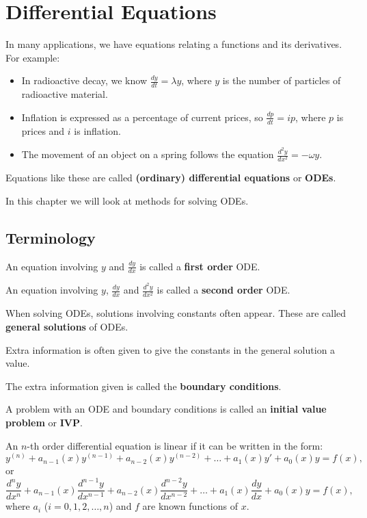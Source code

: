 \chapter{Differential Equations}

In many applications, we have equations relating a functions and its derivatives. For example:

\begin{itemize}
\item[ ] In radioactive decay, we know $\displaystyle \frac{dy}{dt} = \lambda y$, where $y$ is the number of particles of radioactive material.
\item[ ] Inflation is expressed as a percentage of current prices, so $\displaystyle \frac{dp}{dt} = i p$, where $p$ is prices and $i$ is inflation.
\item[ ] The movement of an object on a spring follows the equation $\displaystyle \frac{d^2 y}{dx^2} = -\omega y$.
\end{itemize}

Equations like these are called \textbf{(ordinary) differential equations} or \textbf{ODEs}.

In this chapter we will look at methods for solving ODEs.

\section{Terminology}
\begin{definition}
An equation involving $y$ and $\displaystyle\frac{dy}{dx}$ is called a \textbf{first order} ODE.

An equation involving $y$, $\displaystyle\frac{dy}{dx}$ and $\displaystyle\frac{d^2y}{dx^2}$ is called a \textbf{second order} ODE.

When solving ODEs, solutions involving constants often appear. These are called \textbf{general solutions} of ODEs.
\end{definition}

Extra information is often given to give the constants in the general solution a value.

\begin{definition}
The extra information given is called the \textbf{boundary conditions}.

A problem with an ODE and boundary conditions is called an \textbf{initial value problem} or \textbf{IVP}.
\end{definition}

\begin{definition}
An $n$-th order differential equation is linear if it can be written in the form:
\begin{equation*}
y^{(n)}+a_{n-1}(x)y^{(n-1)}+a_{n-2}(x)y^{(n-2)}+\dots+a_{1}(x)y'+a_{0}(x)y=f(x),
\end{equation*}
or
\begin{equation*}
\frac{d^ny}{dx^n}+a_{n-1}(x)\frac{d^{n-1}y}{dx^{n-1}}+a_{n-2}(x)\frac{d^{n-2}y}{dx^{n-2}}+\dots+a_1(x)\frac{dy}{dx}+a_0(x)y=f(x),
\end{equation*}
where $a_i$ ($i=0,1,2,\dots,n$) and $f$ are known functions of $x$. 
\end{definition}


